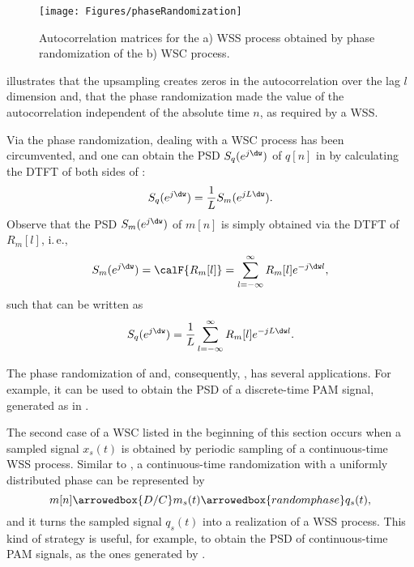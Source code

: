 

\begin{figure}[htbp]
	\centering
		\texttt{[image: Figures/phaseRandomization]}		
	\caption{Autocorrelation matrices for the a) WSS process obtained by phase randomization of the 
	b) WSC process.\label{fig:phaseRandomization}}
\end{figure}

 illustrates that the upsampling creates zeros in the autocorrelation
over the lag $l$ dimension and, that the phase randomization made the value of the autocorrelation
independent of the absolute time $n$, as required by a WSS. 
\eExample

Via the phase randomization, dealing with a WSC process has been circumvented, and one can 
obtain the PSD $S_q(e^{j \dw})$ of $q[n]$ in  by calculating the DTFT of both sides of :
\begin{equation}
S_q(e^{j \dw}) = \frac{1}{L} S_m(e^{j L \dw}).
\label{eq:randomShiftPSD}
\end{equation}
Observe that the PSD $S_m(e^{j\dw})$ of $m[n]$ is simply obtained via the DTFT of $R_m[l]$, i.\,e.,
\begin{equation}
S_m(e^{j\dw}) = \calF\{R_m[l]\} = \sum_{l=-\infty}^{\infty} R_m[l] e^{-j \dw l},
\label{eq:psd_periodic}
\end{equation}
such that  can be written as
\begin{equation}
S_q(e^{j \dw}) = \frac{1}{L} \sum_{l=-\infty}^{\infty} R_m[l] e^{-j L \dw l}.
\label{eq:randomShiftPSD2}
\end{equation}

\ifml
\else
The phase randomization of  and, consequently, , has several applications. For example,
it can be used to obtain the PSD of a discrete-time PAM signal, generated as in
.
\fi

The second case of a WSC listed in the beginning of this section occurs when a sampled signal $x_s(t)$ is obtained by periodic sampling of a continuous-time WSS process.
Similar to , a continuous-time randomization with a uniformly distributed phase can be represented by
\begin{equation}
m[n] \arrowedbox{D/C} m_s(t) \arrowedbox{random phase} q_s(t),
\label{eq:randomPhaseContinuousTime}
\end{equation}
and it turns the sampled signal $q_s(t)$ into a realization of a WSS process.
\ifml
\else
This kind of strategy is useful, for example, to obtain the PSD of continuous-time
PAM signals, as the ones generated by .
\fi

